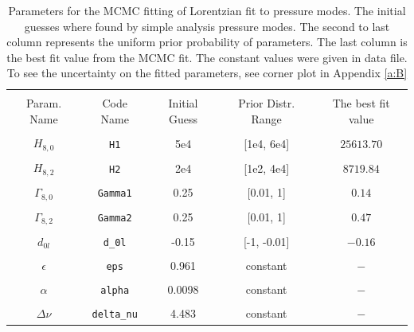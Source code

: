 \documentclass[12pt]{article}
\begin{document}


\begin{table}[H]
  \centering
  \begin{tabular}{|c|c|c|c|c|}
    \hline 
    & & & &\\[-0.5em]
    Param. Name & Code Name & Initial Guess & Prior Distr. Range & The best fit value \\[5pt] \hline
    & & & &\\[-0.5em]
    $H_{8,0} $ & \texttt{H1} & 5e4 & [1e4, 6e4] & $25613.70$ \\[5pt] \hline
    & & & &\\[-0.5em]
    $H_{8,2}$ & \texttt{H2} & 2e4 & [1e2, 4e4] & $8719.84$\\[5pt] \hline
    & & & &\\[-0.5em] 
    $\Gamma_{8,0}$ & \texttt{Gamma1} & 0.25 & [0.01, 1] & $0.14$\\[5pt] \hline
    & & & &\\[-0.5em]
    $\Gamma_{8,2}$ & \texttt{Gamma2} & 0.25 & [0.01, 1] & $0.47$\\[5pt] \hline 
    & & & &\\[-0.5em]
    $d_{0l}$ & \texttt{d\_0l} & -0.15 & [-1, -0.01] & $-0.16$\\[5pt]  \hline
    & & & &\\[-0.5em]
    $\epsilon$ & \texttt{eps} & 0.961 & constant & $-$\\[5pt]  \hline
    & & & &\\[-0.5em]
    $\alpha$ & \texttt{alpha} & 0.0098 & constant & $-$\\[5pt]  \hline
    & & & &\\[-0.5em]
    $\Delta\nu$ & \texttt{delta\_nu} & 4.483 & constant & $-$\\[5pt]  \hline
  \end{tabular}
  \caption{Parameters for the MCMC fitting of Lorentzian fit to pressure modes. The initial guesses where found by simple analysis pressure modes. The second to last column represents the uniform prior probability of parameters. The last column is the best fit value from the MCMC fit. The constant values were given in data file. To see the uncertainty on the fitted parameters, see corner plot in Appendix \ref{a:B}}
  \label{tab:MCMC_param_lorentz}
\end{table}
\end{document}
